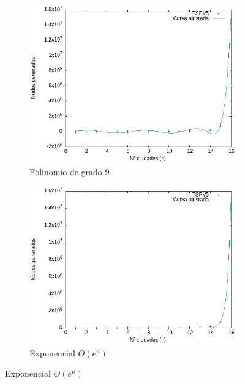 \documentclass{article}
\begin{document}
\begin{figure}[H]
    \centering
    \begin{subfigure}[b]{0.45\textwidth}
        \centering
        \includegraphics[width=\textwidth]{imagenes/cota1/eficiencia_nodos_bb/CurvaAjustada_n9.png}
        \caption{Polinomio de grado 9}
    \end{subfigure}
    \begin{subfigure}[b]{0.45\textwidth}
        \centering
        \includegraphics[width=\textwidth]{imagenes/cota1/eficiencia_nodos_bb/CurvaAjustada_exp.png}
        \caption{Exponencial $O(e^{n})$}
    \end{subfigure}
\end{figure}
\end{document}
